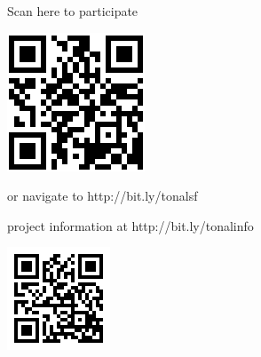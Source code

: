 \documentclass{article}
\begin{document}
	\centerline{\Huge{Scan here to participate}}	
	\includegraphics[width=\textwidth]{client-qr.png}
	\centerline{\Huge{or navigate to http://bit.ly/tonalsf}}
	\hline
	\centerline{\Huge{project information at http://bit.ly/tonalinfo}}
	\centerline{\includegraphics[scale=1.00]{info-qr.png}}
\end{document}
